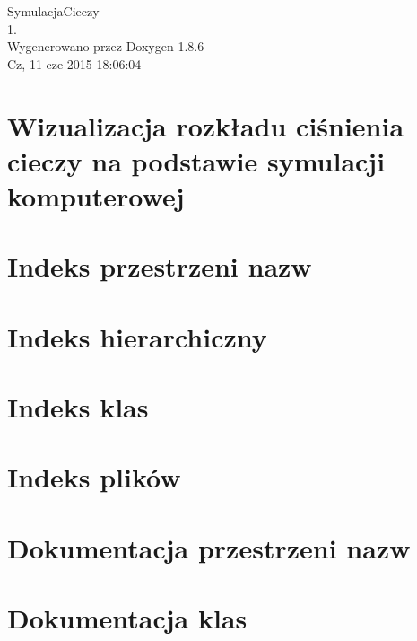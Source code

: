 \documentclass[twoside]{book}
\newcommand{\clearemptydoublepage}{%
  \newpage{\pagestyle{empty}\cleardoublepage}%
}
\begin{document}
\hypersetup{pageanchor=false}
\begin{titlepage}
\vspace*{7cm}
\begin{center}%
{\Large Symulacja\-Cieczy \\[1ex]\large 1. }\\
\vspace*{1cm}
{\large Wygenerowano przez Doxygen 1.8.6}\\
\vspace*{0.5cm}
{\small Cz, 11 cze 2015 18:06:04}\\
\end{center}
\end{titlepage}
\clearemptydoublepage
\tableofcontents
\clearemptydoublepage
{}
\hypersetup{pageanchor=true}

\chapter{Wizualizacja rozkładu ciśnienia cieczy na podstawie symulacji komputerowej}
\label{index}\hypertarget{index}{}
\chapter{Indeks przestrzeni nazw}

\chapter{Indeks hierarchiczny}

\chapter{Indeks klas}

\chapter{Indeks plików}

\chapter{Dokumentacja przestrzeni nazw}

\chapter{Dokumentacja klas}









\end{document}

